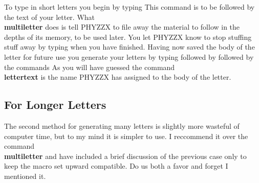 To type in short letters you begin by typing
This command is to be followed by the text of your letter.
What {\bf \\multiletter} does is tell PHYZZX to file away the
material to follow in the depths of its memory, to be used later.
You let PHYZZX know to stop stuffing stuff away by typing
when you have finished.
Having now saved the body of the letter for future use you
generate your letters by typing
followed by
followed by the commands
As you will have guessed the command {\bf \\lettertext}
is the name PHYZZX has assigned to the body of the
letter.
 
\subsection{For Longer Letters}
 
The second method for generating many letters is slightly more wasteful
of computer time, but to my mind it is simpler to use.
I reccommend it over the command {\bf \\multiletter} and
have included a brief discussion of the previous case only
to keep the macro set upward compatible.
Do us both a favor and forget I mentioned it.
 

